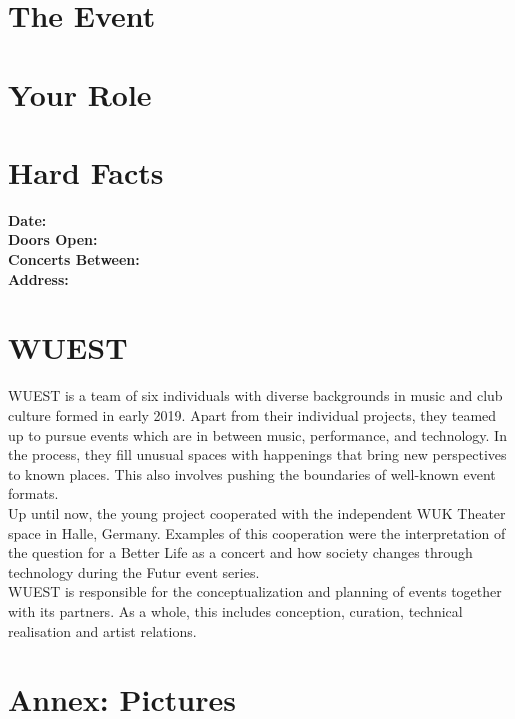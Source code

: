 \documentclass[a4paper, 11pt]{article}
\begin{document}
\pagestyle{empty}

\section*{The Event}

\section*{Your Role}

\section*{Hard Facts}

\begin{multicols}{2}

\textbf{Date:} \\
\textbf{Doors Open:} \\
\textbf{Concerts Between:} \\
\textbf{Address:} \\

    
\end{multicols}

\section*{WUEST}
WUEST is a team of six individuals with diverse backgrounds in music and club 
culture formed in early 2019. Apart from their individual projects, they 
teamed up to pursue events which are in between music, performance, and 
technology. In the process, they fill unusual spaces with happenings that 
bring new perspectives to known places. This also involves pushing the boundaries 
of well-known event formats. \\
Up until now, the young project cooperated with the independent WUK Theater space 
in Halle, Germany. Examples of this cooperation were the interpretation of the
question for a Better Life as a concert and how society changes through 
technology during the Futur event series. \\
WUEST is responsible for the conceptualization and planning of events together 
with its partners. As a whole, this includes conception, curation, technical 
realisation and artist relations.


\section*{Annex: Pictures}
\end{document}

